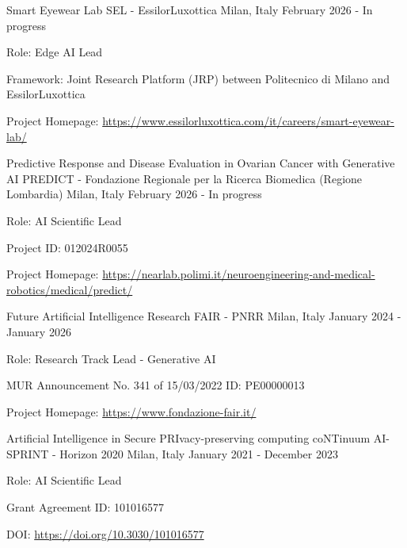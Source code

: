 
\begin{cventries}

    \vspace{2mm}
    \cventry
        {Smart Eyewear Lab}
        {SEL - EssilorLuxottica}
        {Milan, Italy}
        {February 2026 - In progress}
        {
        \begin{cvitems}
            \item {Role: Edge AI Lead}
            \item {Framework: Joint Research Platform (JRP) between Politecnico di Milano and EssilorLuxottica}
            \item {Project Homepage: \url{https://www.essilorluxottica.com/it/careers/smart-eyewear-lab/}}
        \end{cvitems}
        }     

    \vspace{2mm}
    \cventry
        {Predictive Response and Disease Evaluation in Ovarian Cancer with Generative AI}
        {PREDICT - Fondazione Regionale per la Ricerca Biomedica (Regione Lombardia)}
        {Milan, Italy}
        {February 2026 - In progress}
        {
        \begin{cvitems}
            \item {Role: AI Scientific Lead}
            \item {Project ID: 012024R0055}
            \item {Project Homepage: \url{https://nearlab.polimi.it/neuroengineering-and-medical-robotics/medical/predict/}}
        \end{cvitems}
        }     

    \vspace{2mm}
    \cventry
        {Future Artificial Intelligence Research}
        {FAIR - PNRR}
        {Milan, Italy}
        {January 2024 - January 2026}
        {
        \begin{cvitems}
            \item {Role: Research Track Lead - Generative AI}
            \item {MUR Announcement No. 341 of 15/03/2022 ID: PE00000013}
            \item {Project Homepage: \url{https://www.fondazione-fair.it/}}
        \end{cvitems}
        }     

    \vspace{2mm}
    \cventry
        {Artificial Intelligence in Secure PRIvacy-preserving computing coNTinuum}
        {AI-SPRINT - Horizon 2020}
        {Milan, Italy}
        {January 2021 - December 2023}
        {
        \begin{cvitems}
            \item {Role: AI Scientific Lead}
            \item {Grant Agreement ID: 101016577}
            \item {DOI: \url{https://doi.org/10.3030/101016577}}
        \end{cvitems}
        }        


\end{cventries}
